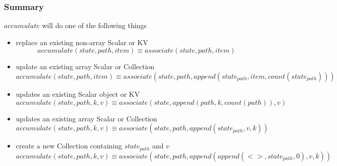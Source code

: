 \documentclass[../main.tex]{subfiles}
\begin{document}
\subsubsection{Summary}
$accumulate$ will do one of the following things
\begin{itemize}
\item replace an existing non-array Scalar or KV
  $$accumulate(state, path, item) \equiv associate(state, path, item)$$
\item update an existing array Scalar or Collection
  $$accumulate(state, path, item) \equiv associate(state, path, append(state_{path}, item, count(state_{path})))$$
\item updates an existing Scalar object or KV
  $$accumulate(state, path, k, v) \equiv associate(state, append(path, k, count(path)), v)$$
\item updates an existing array Scalar or Collection
  $$accumulate(state, path, k, v) \equiv associate(state, path, append(state_{path}, v, k))$$
\item create a new Collection containing $state_{path}$ and $v$
  $$accumulate(state, path, k, v) \equiv associate(state, path, append(append(<>, state_{path}, 0), v, k))$$
\end{itemize}
\end{document}
